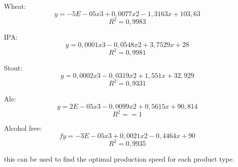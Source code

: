 Wheat:\\
\[y = -5E-05x3 + 0,0077x2 - 1,3163x + 103,63\]
\[R^2=0,9983\]

IPA:\\
\[y = 0,0001x3 - 0,0548x2 + 3,7529x + 28\]
\[R^2=0,9981\]

Stout:\\
\[y = 0,0002x3 - 0,0319x2 + 1,551x + 32,929\]
\[R^2=0,9331\]

Ale:\\
\[y = 2E-05x3 - 0,0099x2 + 0,5615x + 90,814\]
\[R^2== 1\]

Alcohol free:\\
\[fy = -3E-05x3 + 0,0021x2 - 0,4464x + 90\]
\[R^2=0,9935\]


this can be used to find the optimal production speed for each product type. 
